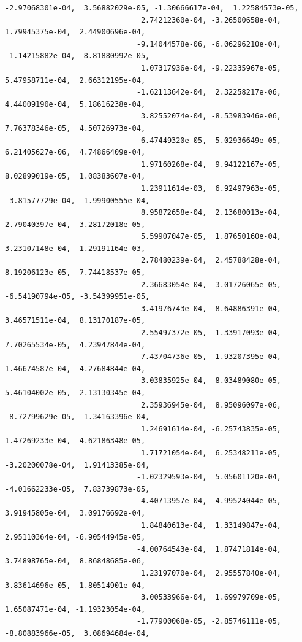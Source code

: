 \documentclass[11pt]{article}
\begin{document}
\begin{Verbatim}[commandchars=\\\{\}]
                              -2.97068301e-04,  3.56882029e-05, -1.30666617e-04,  1.22584573e-05,
                               2.74212360e-04, -3.26500658e-04,  1.79945375e-04,  2.44900696e-04,
                              -9.14044578e-06, -6.06296210e-04, -1.14215882e-04,  8.81880992e-05,
                               1.07317936e-04, -9.22335967e-05,  5.47958711e-04,  2.66312195e-04,
                              -1.62113642e-04,  2.32258217e-06,  4.44009190e-04,  5.18616238e-04,
                               3.82552074e-04, -8.53983946e-06,  7.76378346e-05,  4.50726973e-04,
                              -6.47449320e-05, -5.02936649e-05,  6.21405627e-06,  4.74866409e-04,
                               1.97160268e-04,  9.94122167e-05,  8.02899019e-05,  1.08383607e-04,
                               1.23911614e-03,  6.92497963e-05, -3.81577729e-04,  1.99900555e-04,
                               8.95872658e-04,  2.13680013e-04,  2.79040397e-04,  3.28172018e-05,
                               5.59907047e-05,  1.87650160e-04,  3.23107148e-04,  1.29191164e-03,
                               2.78480239e-04,  2.45788428e-04,  8.19206123e-05,  7.74418537e-05,
                               2.36683054e-04, -3.01726065e-05, -6.54190794e-05, -3.54399951e-05,
                              -3.41976743e-04,  8.64886391e-04,  3.46571511e-04,  8.13170187e-05,
                               2.55497372e-05, -1.33917093e-04,  7.70265534e-05,  4.23947844e-04,
                               7.43704736e-05,  1.93207395e-04,  1.46674587e-04,  4.27684844e-04,
                              -3.03835925e-04,  8.03489080e-05,  5.46104002e-05,  2.13130345e-04,
                               2.35936945e-04,  8.95096097e-06, -8.72799629e-05, -1.34163396e-04,
                               1.24691614e-04, -6.25743835e-05,  1.47269233e-04, -4.62186348e-05,
                               1.71721054e-04,  6.25348211e-05, -3.20200078e-04,  1.91413385e-04,
                              -1.02329593e-04,  5.05601120e-04, -4.01662233e-05,  7.83739873e-05,
                               4.40713957e-04,  4.99524044e-05,  3.91945805e-04,  3.09176692e-04,
                               1.84840613e-04,  1.33149847e-04,  2.95110364e-04, -6.90544945e-05,
                              -4.00764543e-04,  1.87471814e-04,  3.74898765e-04,  8.86848685e-06,
                               1.23197070e-04,  2.95557840e-04,  3.83614696e-05, -1.80514901e-04,
                               3.00533966e-04,  1.69979709e-05,  1.65087471e-04, -1.19323054e-04,
                              -1.77900068e-05, -2.85746111e-05, -8.80883966e-05,  3.08694684e-04,

\end{Verbatim}
\end{document}
